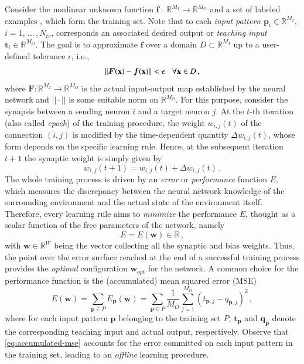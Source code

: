 \documentclass[longtitle]{elsarticle}
\numberwithin{equation}{section}
\theoremstyle{theorem}
\theoremstyle{definition}
\theoremstyle{remark}
\theoremstyle{proposition}
\numberwithin{figure}{section}
\newcommand{\bg}[1]{\boldsymbol{#1}}
\begin{document}
		Consider the nonlinear unknown function $\bg{f} ~ : ~ \mathbb{R}^{M_I} \rightarrow \mathbb{R}^{M_O}$ and a set of labeled examples \smash{$\big\lbrace \mathbf{p}_i, \mathbf{t}_i = \bg{f}(\mathbf{p}_i)\big\rbrace_{1 \leq i \leq N_{tr}}$}, which form the training set. Note that to each \emph{input pattern} $\mathbf{p}_i \in \mathbb{R}^{M_I}$, $i = 1, \, \ldots \, , N_{tr}$, corresponds an associated desired output or \emph{teaching input} $\mathbf{t}_i \in \mathbb{R}^{M_O}$. The goal is to approximate $\bg{f}$ over a domain $D \subset \mathbb{R}^{M_I}$ up to a user-defined tolerance $\epsilon$, i.e.,
		\begin{equation*}
			||\bg{F}(\mathbf{x}) - \boldsymbol{f}(\mathbf{x})|| < \epsilon \hspace*{0.3cm} \text{$\forall \mathbf{x} \in D$} \, ,
		\end{equation*}
		where $\bg{F} : \mathbb{R}^{M_I} \rightarrow \mathbb{R}^{M_O}$ is the actual input-output map established by the neural network and $||\cdot||$ is some suitable norm on $\mathbb{R}^{M_O}$. For this purpose, consider the synapsis between a sending neuron $i$ and a target neuron $j$. At the $t$-th iteration (also called \emph{epoch}) of the training procedure, the weight $w_{i,j}(t)$ of the connection $(i,j)$ is modified by the time-dependent quantity $\Delta w_{i,j}(t)$, whose form depends on the specific learning rule. Hence, at the subsequent iteration $t+1$ the synaptic weight is simply given by
		\begin{equation*}
			\label{eq:weight-update}
			w_{i,j}(t+1) = w_{i,j}(t) + \Delta w_{i,j}(t) \, .
		\end{equation*}
		The whole training process is driven by an \emph{error} or \emph{performance} function $E$, which measures the discrepancy between the neural network knowledge of the surrounding environment and the actual state of the environment itself. Therefore, every learning rule aims to \emph{minimize} the performance $E$, thought as a scalar function of the free parameters of the network, namely 
		\begin{equation*}
			\label{eq:performance-function}
			E = E(\mathbf{w}) \in \mathbb{R} \, , 
		\end{equation*}
		with $\mathbf{w} \in \mathbb{R}^{W}$ being the vector collecting all the synaptic and bias weights. Thus, the point over the error surface reached at the end of a successful training process provides the \emph{optimal} configuration $\mathbf{w}_{opt}$ for the network. A common choice for the performance function is the (accumulated) mean squared error (MSE)
		\begin{equation}
			\label{eq:accumulated-mse}
			E(\mathbf{w}) = \sum_{\mathbf{p} \in P} E_{\mathbf{p}}(\mathbf{w}) = \sum_{\mathbf{p} \in P} \dfrac{1}{M_O} \sum_{j = 1}^{M_O} \left( t_{\mathbf{p},j} - q_{\mathbf{p},j} \right)^2 \, ,
		\end{equation}
		where for each input pattern $\mathbf{p}$ belonging to the training set $P$, $\mathbf{t}_{\mathbf{p}}$ and $\mathbf{q}_{\mathbf{p}}$ denote the corresponding teaching input and actual output, respectively. Observe that \eqref{eq:accumulated-mse} accounts for the error committed on each input pattern in the training set, leading to an \emph{offline} learning procedure.
		
\end{document}
